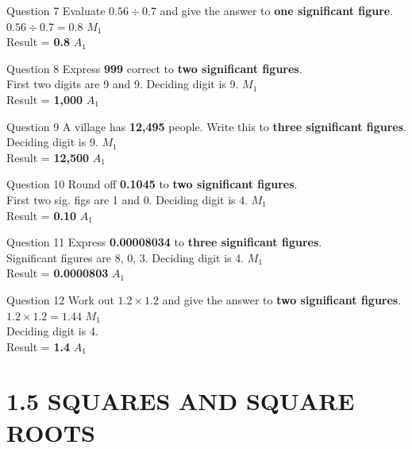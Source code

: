 \documentclass[12pt, a4paper, oneside]{article}
\begin{document}
\begin{solvingbox}{Question 7}
Evaluate $0.56 \div 0.7$ and give the answer to \textbf{one significant figure}. \\
$0.56 \div 0.7 = 0.8$ \hfill $M_1$ \\
Result = \textbf{0.8} \hfill $A_1$
\end{solvingbox}

\begin{solvingbox}{Question 8}
Express \textbf{999} correct to \textbf{two significant figures}. \\
First two digits are 9 and 9. Deciding digit is 9. \hfill $M_1$ \\
Result = \textbf{1,000} \hfill $A_1$
\end{solvingbox}

\begin{solvingbox}{Question 9}
A village has \textbf{12,495} people. Write this to \textbf{three significant figures}. \\
Deciding digit is 9. \hfill $M_1$ \\
Result = \textbf{12,500} \hfill $A_1$
\end{solvingbox}

\begin{solvingbox}{Question 10}
Round off \textbf{0.1045} to \textbf{two significant figures}. \\
First two sig. figs are 1 and 0. Deciding digit is 4. \hfill $M_1$ \\
Result = \textbf{0.10} \hfill $A_1$
\end{solvingbox}

\begin{solvingbox}{Question 11}
Express \textbf{0.00008034} to \textbf{three significant figures}. \\
Significant figures are 8, 0, 3. Deciding digit is 4. \hfill $M_1$ \\
Result = \textbf{0.0000803} \hfill $A_1$
\end{solvingbox}

\begin{solvingbox}{Question 12}
Work out $1.2 \times 1.2$ and give the answer to \textbf{two significant figures}. \\
$1.2 \times 1.2 = 1.44$ \hfill $M_1$ \\
Deciding digit is 4. \\
Result = \textbf{1.4} \hfill $A_1$
\end{solvingbox}

\section*{1.5 SQUARES AND SQUARE ROOTS}
\end{document}
